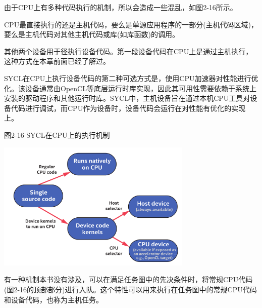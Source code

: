 
由于CPU上有多种代码执行的机制，所以会造成一些混乱，如图2-16所示。\par

CPU最直接执行的还是主机代码，要么是单源应用程序的一部分(主机代码区域)，要么是主机代码对其他主机代码或库(如库函数)的调用。\par

其他两个设备用于径执行设备代码。第一段设备代码在CPU上是通过主机执行，这种方式在本章前面已经了解过。\par

SYCL在CPU上执行设备代码的第二种可选方式是，使用CPU加速器对性能进行优化。该设备通常由OpenCL等底层运行时库实现，因此其可用性需要依赖于系统上安装的驱动程序和其他运行时库。SYCL中，主机设备旨在通过本机CPU工具对设备代码进行调试，而CPU作为设备时，设备代码会运行在对性能有优化的实现上。\par

\hspace*{\fill} \par %
图2-16 SYCL在CPU上的执行机制
\begin{center}
	\includegraphics[width=0.7\textwidth]{content/chapter-2/images/9}
\end{center}

有一种机制本书没有涉及，可以在满足任务图中的先决条件时，将常规CPU代码(图2-16的顶部部分)进行入队。这个特性可以用来执行在任务图中的常规CPU代码和设备代码，也称为主机任务。\par








